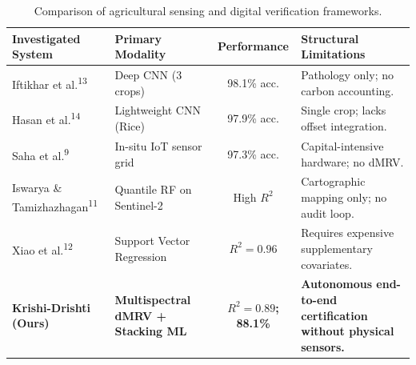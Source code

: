 \documentclass[a4paper,10pt]{article}
\begin{document}
\begin{table}[htbp]
  \caption{Comparison of agricultural sensing and digital verification frameworks.}
  \label{tab:comp_spie}
  \centering
  \setlength{\tabcolsep}{5pt}
  \begin{tabularx}{\textwidth}{l l c >{\raggedright\arraybackslash}X}
    \toprule
    \textbf{Investigated System} & \textbf{Primary Modality} & \textbf{Performance} & \textbf{Structural Limitations} \\
    \midrule
    Iftikhar et al.\textsuperscript{13} & Deep CNN (3 crops)          & 98.1\% acc.    & Pathology only; no carbon accounting. \\
    Hasan et al.\textsuperscript{14}    & Lightweight CNN (Rice)      & 97.9\% acc.    & Single crop; lacks offset integration. \\
    Saha et al.\textsuperscript{9}    & In-situ IoT sensor grid     & 97.3\% acc.    & Capital-intensive hardware; no dMRV. \\
    Iswarya \& Tamizhazhagan\textsuperscript{11} & Quantile RF on Sentinel-2 & High $R^2$ & Cartographic mapping only; no audit loop. \\
    Xiao et al.\textsuperscript{12}    & Support Vector Regression   & $R^2 = 0.96$   & Requires expensive supplementary covariates. \\
    \midrule
    \textbf{Krishi-Drishti (Ours)}     & \textbf{Multispectral dMRV + Stacking ML} & \textbf{$R^2 = 0.89$; 88.1\%} & \textbf{Autonomous end-to-end certification without physical sensors.} \\
    \bottomrule
  \end{tabularx}
\end{table}
\end{document}
